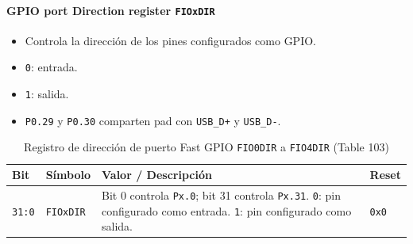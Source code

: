 \paragraph{GPIO port Direction register \texttt{FIOxDIR}}
\begin{itemize}
  \item Controla la dirección de los pines configurados como GPIO.
  \item \texttt{0}: entrada.
  \item \texttt{1}: salida.
  \item \texttt{P0.29} y \texttt{P0.30} comparten pad con \texttt{USB\_D+} y \texttt{USB\_D-}.
\end{itemize}

\begin{table}[H]
  \centering
  \small
  \caption{Registro de dirección de puerto Fast GPIO \texttt{FIO0DIR} a \texttt{FIO4DIR} (Table 103)}
  \begin{tabularx}{0.96\textwidth}{|>{\centering\arraybackslash}p{}|>{\raggedright\arraybackslash}p{}|>{\raggedright\arraybackslash}X|>{\centering\arraybackslash}p{}|}
    \hline
    \textbf{Bit} & \textbf{Símbolo} & \textbf{Valor / Descripción} & \textbf{Reset} \\
    \hline
    \texttt{31:0} & \texttt{FIOxDIR} & Bit 0 controla \texttt{Px.0}; bit 31 controla \texttt{Px.31}. \texttt{0}: pin configurado como entrada. \texttt{1}: pin configurado como salida. & \texttt{0x0} \\
    \hline
  \end{tabularx}
\end{table}

